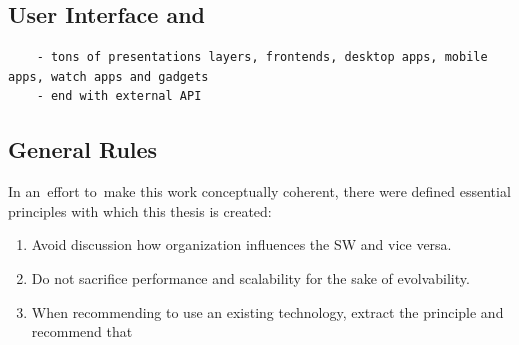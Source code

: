 \documentclass[thesis=M,english,hidelinks]{FITthesis}[2012/10/20]
\begin{document}
\subsection{User Interface and }
\begin{verbatim}
    - tons of presentations layers, frontends, desktop apps, mobile apps, watch apps and gadgets 
    - end with external API
\end{verbatim}

\subsection{General Rules}
In an~effort to~make this work conceptually coherent, there were defined essential principles with which this thesis is created:
\begin{enumerate}
    \item Avoid discussion how organization influences the \acrshort{SW} and vice versa.
    \item Do not sacrifice performance and scalability for the sake of evolvability.
    \item When recommending to use an existing technology, extract the principle and recommend that 
\end{enumerate}
\end{document}

